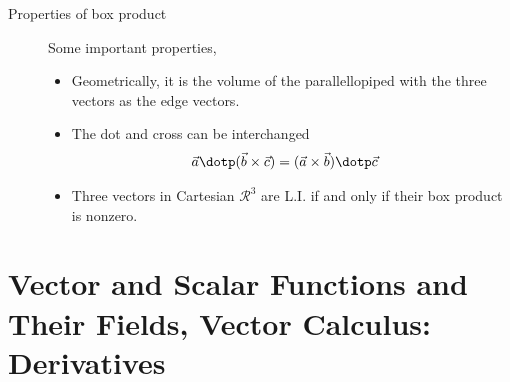 \begin{description}
    \item[Properties of box product] Some important properties,
          \begin{itemize}
              \item Geometrically, it is the volume of the parallellopiped with the three
                    vectors as the edge vectors.
              \item The dot and cross can be interchanged
                    \begin{align}
                        \vec{a} \dotp (\vec{b} \times \vec{c}) & =
                        (\vec{a} \times \vec{b}) \dotp \vec{c}
                    \end{align}
              \item Three vectors in Cartesian $ \mathcal{R}^3 $ are L.I. if and only if
                    their box product is nonzero.
          \end{itemize}
\end{description}

\section{Vector and Scalar Functions and Their Fields, Vector Calculus: Derivatives}

